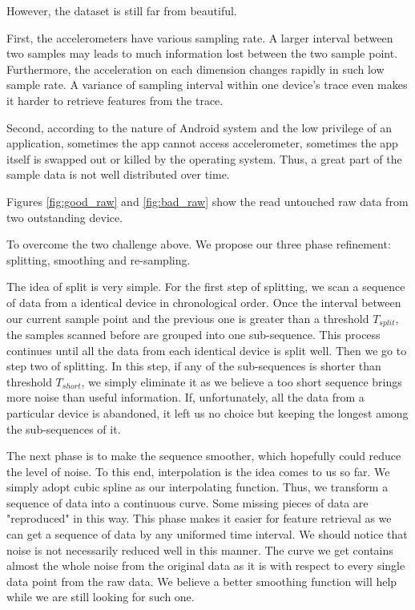 \documentclass{article} %
\begin{document}
However, the dataset is still far from beautiful.

First, the accelerometers have various sampling rate. A larger interval between two samples may leads to much information lost between the two sample point. Furthermore, the acceleration on each dimension changes rapidly in such low sample rate. A variance of sampling interval within one device's trace even makes it harder to retrieve features from the trace.

Second, according to the nature of Android system and the low privilege of an application, sometimes the app cannot access accelerometer, sometimes the app itself is swapped out or killed by the operating system. Thus, a great part of the sample data is not well distributed over time.

Figures \ref{fig:good_raw} and \ref{fig:bad_raw} show the read untouched raw data from two outstanding device. 

To overcome the two challenge above. We propose our three phase refinement: splitting, smoothing and re-sampling.

The idea of split is very simple. For the first step of splitting, we scan a sequence of data from a identical device in chronological order. Once the interval between our current sample point and the previous one is greater than a threshold $T_{split}$, the samples scanned before are grouped into one sub-sequence. This process continues until all the data from each identical device is split well. Then we go to step two of splitting. In this step, if any of the sub-sequences is shorter than threshold $T_{short}$, we simply eliminate it as we believe a too short sequence brings more noise than useful information. If, unfortunately, all the data from a particular device is abandoned, it left us no choice but keeping the longest among the sub-sequences of it.

The next phase is to make the sequence smoother, which hopefully could reduce the level of noise. To this end, interpolation is the idea comes to us so far. We simply adopt cubic spline as our interpolating function. Thus, we transform a sequence of data into a continuous curve. Some missing pieces of data are "reproduced" in this way. This phase makes it easier for feature retrieval as we can get a sequence of data by any uniformed time interval. We should notice that noise is not necessarily reduced well in this manner. The curve we get contains almost the whole noise from the original data as it is with respect to every single data point from the raw data. We believe a better smoothing function will help while we are still looking for such one.
\end{document}
